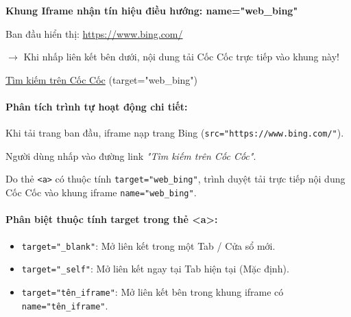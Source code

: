 \documentclass[11pt,oneside]{book}
\newcommand{\codeinline}[1]{\textcolor{accentOrange}{\texttt{#1}}}
\begin{document}
\begin{browserWindow}[https://www.bing.com (name="web\_bing")]
\centering\sffamily\vspace{4pt}
{\bfseries\color{primaryBlue}\large Khung Iframe nhận tín hiệu điều hướng: name="web\_bing"} \par\vspace{6pt}
\small Ban đầu hiển thị: \textcolor{primaryBlue}{\underline{https://www.bing.com/}} \par\vspace{4pt}
\small\textcolor{accentOrange}{$\rightarrow$ Khi nhấp liên kết bên dưới, nội dung tải Cốc Cốc trực tiếp vào khung này!} \par\vspace{8pt}
\textcolor{primaryBlue}{\underline{Tìm kiếm trên Cốc Cốc}} \quad \small\textcolor{codeComment}{(target="web\_bing")} \par\vspace{4pt}
\end{browserWindow}

\paragraph{Phân tích trình tự hoạt động chi tiết:}
\begin{description}[font=\sffamily\bfseries\color{primaryBlue}, leftmargin=4.8em, style=sameline, itemsep=4pt]
    \item[{\tcbox[colback=primaryBlue,coltext=white,boxsep=1pt,left=4pt,right=4pt,top=1pt,bottom=1pt,arc=3pt,fontupper=\sffamily\tiny\bfseries]{BƯỚC 1}}] Khi tải trang ban đầu, iframe nạp trang Bing (\codeinline{src="https://www.bing.com/"}).
    \item[{\tcbox[colback=primaryBlue,coltext=white,boxsep=1pt,left=4pt,right=4pt,top=1pt,bottom=1pt,arc=3pt,fontupper=\sffamily\tiny\bfseries]{BƯỚC 2}}] Người dùng nhấp vào đường link \textit{"Tìm kiếm trên Cốc Cốc"}.
    \item[{\tcbox[colback=primaryBlue,coltext=white,boxsep=1pt,left=4pt,right=4pt,top=1pt,bottom=1pt,arc=3pt,fontupper=\sffamily\tiny\bfseries]{BƯỚC 3}}] Do thẻ \codeinline{<a>} có thuộc tính \codeinline{target="web\_bing"}, trình duyệt tải trực tiếp nội dung Cốc Cốc vào khung iframe \codeinline{name="web\_bing"}.
\end{description}

\paragraph{Phân biệt thuộc tính target trong thẻ <a>:}
\begin{itemize}[leftmargin=1.8em, itemsep=3pt, parsep=0pt]
    \item \codeinline{target="\_blank"}: Mở liên kết trong một Tab / Cửa sổ mới.
    \item \codeinline{target="\_self"}: Mở liên kết ngay tại Tab hiện tại (Mặc định).
    \item \codeinline{target="tên\_iframe"}: Mở liên kết bên trong khung iframe có \codeinline{name="tên\_iframe"}.
\end{itemize}
\end{document}
